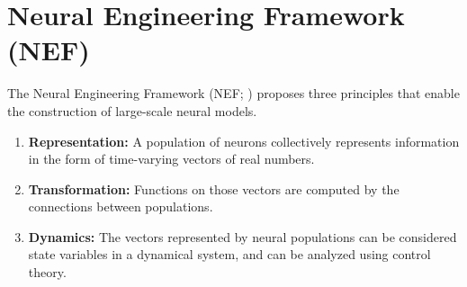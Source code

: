 \documentclass{frontiersSCNS}
\begin{document}
\section{Neural Engineering Framework (NEF)}

The Neural Engineering Framework (NEF; \cite{TODO})
proposes three principles
that enable the construction
of large-scale neural models.

\begin{enumerate}
  \item \textbf{Representation:} A population of neurons
    collectively represents information in the form of
    time-varying vectors of real numbers.
  \item \textbf{Transformation:} Functions on those vectors
    are computed by the connections between populations.
  \item \textbf{Dynamics:} The vectors represented
    by neural populations can be considered state variables
    in a dynamical system, and can be analyzed using control theory.
\end{enumerate}
\end{document}
